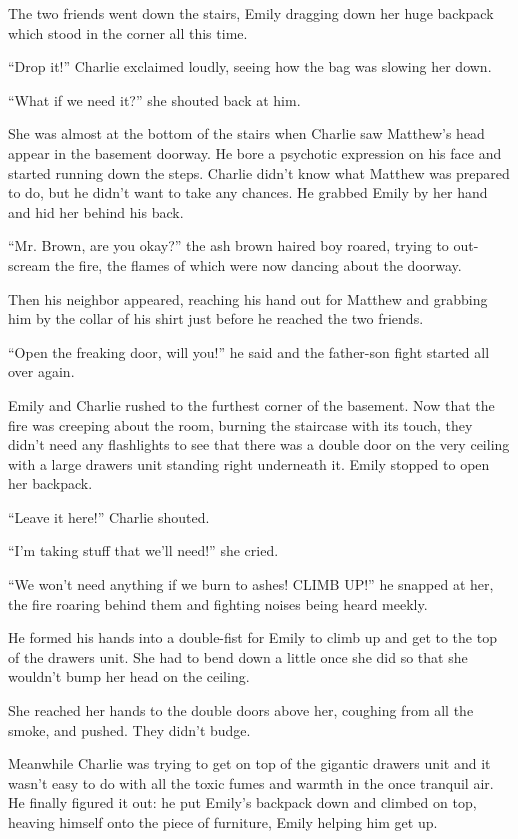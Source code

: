The two friends went down the stairs, Emily dragging down her huge backpack which stood in the corner all this time.

“Drop it!” Charlie exclaimed loudly, seeing how the bag was slowing her down.

“What if we need it?” she shouted back at him.

She was almost at the bottom of the stairs when Charlie saw Matthew’s head appear in the basement doorway. He bore a psychotic expression on his face and started running down the steps. Charlie didn’t know what Matthew was prepared to do, but he didn’t want to take any chances. He grabbed Emily by her hand and hid her behind his back.

“Mr. Brown, are you okay?” the ash brown haired boy roared, trying to out-scream the fire, the flames of which were now dancing about the doorway.

Then his neighbor appeared, reaching his hand out for Matthew and grabbing him by the collar of his shirt just before he reached the two friends.

“Open the freaking door, will you!” he said and the father-son fight started all over again.

Emily and Charlie rushed to the furthest corner of the basement. Now that the fire was creeping about the room, burning the staircase with its touch, they didn’t need any flashlights to see that there was a double door on the very ceiling with a large drawers unit standing right underneath it. Emily stopped to open her backpack.

“Leave it here!” Charlie shouted.

“I’m taking stuff that we’ll need!” she cried.

“We won’t need anything if we burn to ashes! CLIMB UP!” he snapped at her, the fire roaring behind them and fighting noises being heard meekly.

He formed his hands into a double-fist for Emily to climb up and get to the top of the drawers unit. She had to bend down a little once she did so that she wouldn’t bump her head on the ceiling.

She reached her hands to the double doors above her, coughing from all the smoke, and pushed. They didn’t budge. 

Meanwhile Charlie was trying to get on top of the gigantic drawers unit and it wasn’t easy to do with all the toxic fumes and warmth in the once tranquil air. He finally figured it out: he put Emily’s backpack down and climbed on top, heaving himself onto the piece of furniture, Emily helping him get up.

